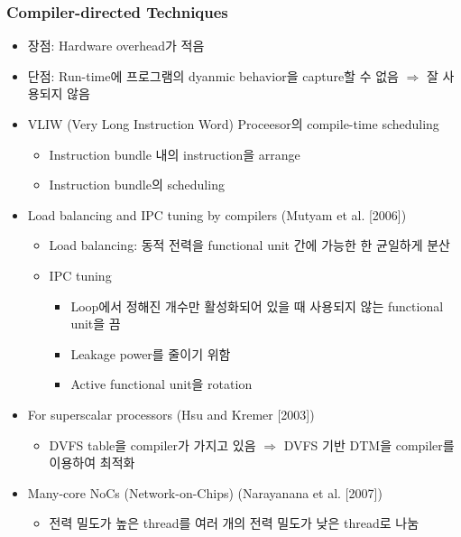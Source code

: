 \subsubsection*{Compiler-directed Techniques}
\begin{itemize}
    \item 장점: Hardware overhead가 적음
    \item 단점: Run-time에 프로그램의 dyanmic behavior을 capture할 수 없음 $\Rightarrow$ 잘 사용되지 않음
    \item VLIW (Very Long Instruction Word) Proceesor의 compile-time scheduling
    \begin{itemize}
        \item Instruction bundle 내의 instruction을 arrange
        \item Instruction bundle의 scheduling
    \end{itemize}
    \item Load balancing and IPC tuning by compilers (Mutyam et al. [2006])
    \begin{itemize}
        \item Load balancing: 동적 전력을 functional unit 간에 가능한 한 균일하게 분산
        \item IPC tuning
        \begin{itemize}
            \item Loop에서 정해진 개수만 활성화되어 있을 때 사용되지 않는 functional unit을 끔
            \item Leakage power를 줄이기 위함
            \item Active functional unit을 rotation
        \end{itemize}
    \end{itemize}
    \item For superscalar processors (Hsu and Kremer [2003])
    \begin{itemize}
        \item DVFS table을 compiler가 가지고 있음 $\Rightarrow$ DVFS 기반 DTM을 compiler를 이용하여 최적화
    \end{itemize}
    \item Many-core NoCs (Network-on-Chips) (Narayanana et al. [2007])
    \begin{itemize}
        \item 전력 밀도가 높은 thread를 여러 개의 전력 밀도가 낮은 thread로 나눔
    \end{itemize}
\end{itemize}

